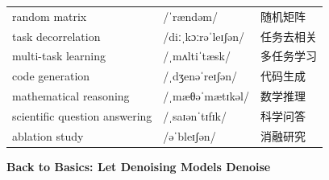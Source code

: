 \documentclass[UTF8,12pt,a4paper]{ctexart}
\providecommand{\zh}[1]{#1}
\begin{document}
\begin{tabular*}{\textwidth}{@{\extracolsep{\fill}}lll@{}}
random matrix & {\ipafont /ˈrændəm/} & \zh{随机矩阵} \\
task decorrelation & {\ipafont /diːˌkɔːrəˈleɪʃən/} & \zh{任务去相关} \\
multi-task learning & {\ipafont /ˌmʌltiˈtæsk/} & \zh{多任务学习} \\
code generation & {\ipafont /ˌdʒenəˈreɪʃən/} & \zh{代码生成} \\
mathematical reasoning & {\ipafont /ˌmæθəˈmætɪkəl/} & \zh{数学推理} \\
scientific question answering & {\ipafont /ˌsaɪənˈtɪfɪk/} & \zh{科学问答} \\
ablation study & {\ipafont /əˈbleɪʃən/} & \zh{消融研究} \\
\bottomrule
\end{tabular*}

\newpage

\begin{center}
    {\Large\bfseries Back to Basics: Let Denoising Models Denoise}
\end{center}
\end{document}
